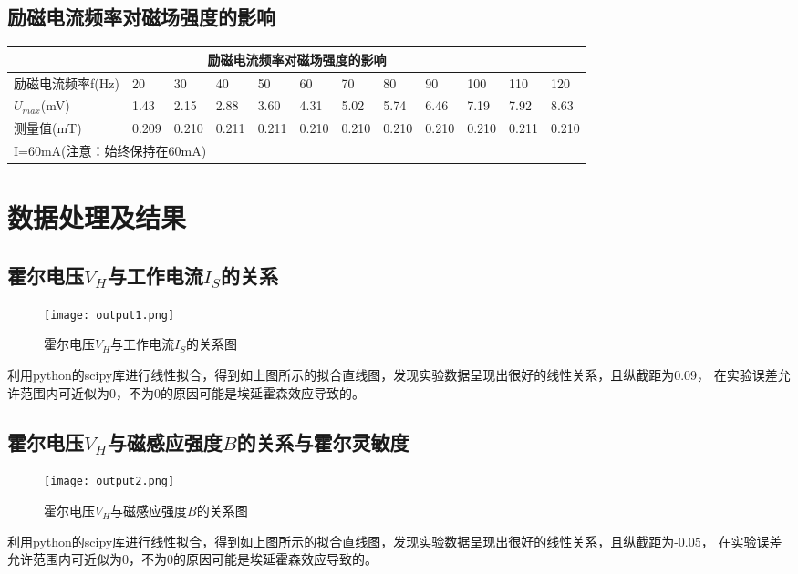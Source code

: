 \documentclass[UTF-8,twoside,cs4size]{ctexart}
\begin{document}
    \subsection{励磁电流频率对磁场强度的影响}
        \begin{table}[!h]
            \centering
            \begin{tabular}{|l|l|l|l|l|l|l|l|l|l|l|l|}
            \hline
                \multicolumn{12}{|c|}{励磁电流频率对磁场强度的影响}  \\ \hline
                励磁电流频率f(Hz) & 20 & 30 & 40 & 50 & 60 & 70 & 80 & 90 & 100 & 110 & 120 \\ \hline
                $U_{max}$(mV) & 1.43 & 2.15 & 2.88 & 3.60 & 4.31 & 5.02 & 5.74 & 6.46 & 7.19 & 7.92 & 8.63 \\ \hline
                测量值(mT) & 0.209 & 0.210 & 0.211 & 0.211 & 0.210 & 0.210 & 0.210 & 0.210 & 0.210 & 0.211 & 0.210 \\ \hline
                \multicolumn{12}{|l|}{I=60mA(注意：始终保持在60mA)} \\ \hline
            \end{tabular}
        \end{table}
    
\section{数据处理及结果}
\subsection{霍尔电压$V_H$与工作电流$I_S$的关系}
    \begin{figure}[!h]
        \centering
        \texttt{[image: output1.png]}
        \caption{霍尔电压$V_H$与工作电流$I_S$的关系图}
    \end{figure}
    利用python的scipy库进行线性拟合，得到如上图所示的拟合直线图，发现实验数据呈现出很好的线性关系，且纵截距为0.09，
    在实验误差允许范围内可近似为0，不为0的原因可能是埃延霍森效应导致的。

\subsection{霍尔电压$V_H$与磁感应强度$B$的关系与霍尔灵敏度}
    \begin{figure}[!h]
        \centering
        \texttt{[image: output2.png]}
        \caption{霍尔电压$V_H$与磁感应强度$B$的关系图}
    \end{figure}
    利用python的scipy库进行线性拟合，得到如上图所示的拟合直线图，发现实验数据呈现出很好的线性关系，且纵截距为-0.05，
    在实验误差允许范围内可近似为0，不为0的原因可能是埃延霍森效应导致的。
    
\end{document}
